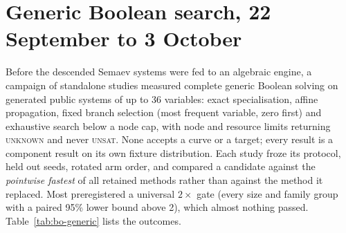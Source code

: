 \section{Generic Boolean search, 22 September to 3 October}\label{sec:bo-generic}

Before the descended Semaev systems were fed to an algebraic engine, a
campaign of standalone studies measured complete generic Boolean solving on
generated public systems of up to 36 variables: exact specialisation,
affine propagation, fixed branch selection (most frequent variable, zero
first) and exhaustive search below a node cap, with node and resource limits
returning \textsc{unknown} and never \textsc{unsat}. None accepts a curve or
a target; every result is a component result on its own fixture
distribution. Each study froze its protocol, held out seeds, rotated arm
order, and compared a candidate against the \emph{pointwise fastest} of all
retained methods rather than against the method it replaced. Most
preregistered a universal $2\times$ gate (every size and family group with a
paired 95\% lower bound above 2), which almost nothing passed.
Table~\ref{tab:bo-generic} lists the outcomes.

